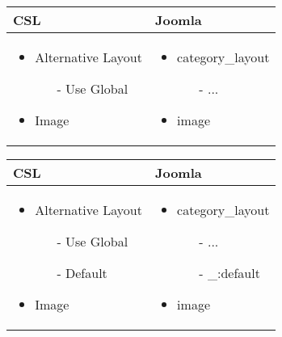 \begin{minipage}{0.6\textwidth}
\begin{tabular}{|p{} | p{}|}
\hline
\textbf{CSL} & \textbf{Joomla} \\ 
\hline
\begin{itemize}
\item Alternative Layout
    \begin{enumerate}
		\item[-] Use Global
	\end{enumerate}
\item Image
\end{itemize}
 & 
\begin{itemize}
\item category\_layout
    \begin{enumerate}
		\item[-] ...
	\end{enumerate}
\item image
\end{itemize}
\\
\hline
\end{tabular}
\end{minipage}

\begin{minipage}{0.5\textwidth}
\begin{tabular}{|p{} | p{}|}
\hline
\textbf{CSL} & \textbf{Joomla} \\ 
\hline
\begin{itemize}
\item Alternative Layout
    \begin{enumerate}
		\item[-] Use Global
		\item[-] Default 
	\end{enumerate}
\item Image
\end{itemize}
 & 
\begin{itemize}
\item category\_layout
    \begin{enumerate}
		\item[-] ...
		\item[-] \_:default
	\end{enumerate}
\item image
\end{itemize}
\\
\hline
\end{tabular}
\end{minipage}

